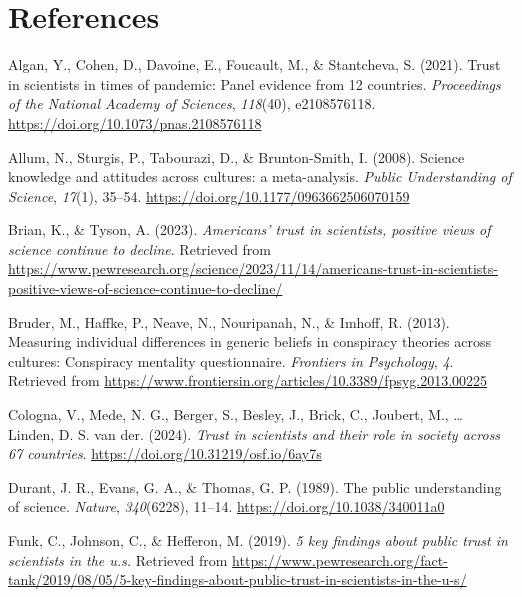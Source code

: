 \documentclass[
  doc,floatsintext]{apa6}
\newlength{\cslhangindent}
\newenvironment{CSLReferences}[2] %
 {\begin{list}{}{%
  \setlength{\itemindent}{0pt}
  \setlength{\leftmargin}{0pt}
  \setlength{\parsep}{0pt}
  \ifodd #1
   \setlength{\leftmargin}{\cslhangindent}
   \setlength{\itemindent}{-1\cslhangindent}
  \fi
  \setlength{\itemsep}{#2\baselineskip}}}
 {\end{list}}
\begin{document}
\FloatBarrier

\section{References}\label{references}

\label{refs}
\begin{CSLReferences}{1}{0}
Algan, Y., Cohen, D., Davoine, E., Foucault, M., \& Stantcheva, S. (2021). Trust in scientists in times of pandemic: Panel evidence from 12 countries. \emph{Proceedings of the National Academy of Sciences}, \emph{118}(40), e2108576118. \url{https://doi.org/10.1073/pnas.2108576118}

Allum, N., Sturgis, P., Tabourazi, D., \& Brunton-Smith, I. (2008). Science knowledge and attitudes across cultures: a meta-analysis. \emph{Public Understanding of Science}, \emph{17}(1), 35--54. \url{https://doi.org/10.1177/0963662506070159}

Brian, K., \& Tyson, A. (2023). \emph{Americans{'} trust in scientists, positive views of science continue to decline}. Retrieved from \url{https://www.pewresearch.org/science/2023/11/14/americans-trust-in-scientists-positive-views-of-science-continue-to-decline/}

Bruder, M., Haffke, P., Neave, N., Nouripanah, N., \& Imhoff, R. (2013). Measuring individual differences in generic beliefs in conspiracy theories across cultures: Conspiracy mentality questionnaire. \emph{Frontiers in Psychology}, \emph{4}. Retrieved from \url{https://www.frontiersin.org/articles/10.3389/fpsyg.2013.00225}

Cologna, V., Mede, N. G., Berger, S., Besley, J., Brick, C., Joubert, M., \ldots{} Linden, D. S. van der. (2024). \emph{Trust in scientists and their role in society across 67 countries}. \url{https://doi.org/10.31219/osf.io/6ay7s}

Durant, J. R., Evans, G. A., \& Thomas, G. P. (1989). The public understanding of science. \emph{Nature}, \emph{340}(6228), 11--14. \url{https://doi.org/10.1038/340011a0}

Funk, C., Johnson, C., \& Hefferon, M. (2019). \emph{5 key findings about public trust in scientists in the u.s.} Retrieved from \url{https://www.pewresearch.org/fact-tank/2019/08/05/5-key-findings-about-public-trust-in-scientists-in-the-u-s/}


\end{CSLReferences}
\end{document}
